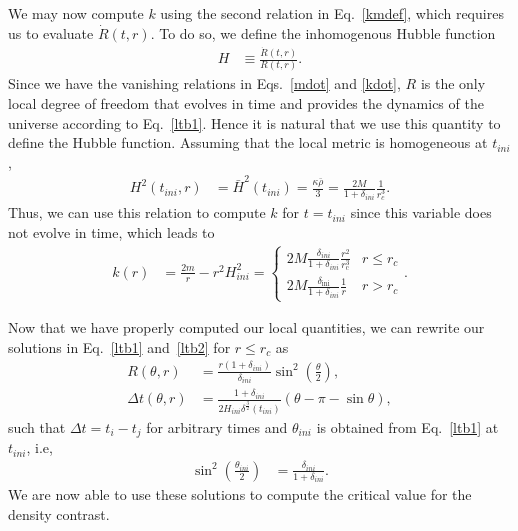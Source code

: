 \documentclass[a4paper,11pt]{article}
\begin{document}
We may now compute $k$ using the second relation in Eq.~\eqref{kmdef}, which requires us to evaluate $\dot{R}(t, r)$. To do so, we define the inhomogenous Hubble function
\begin{align}
	\label{hdefltb}
	H & \equiv \frac{\dot{R}(t, r)}{R(t, r)}
	.\end{align}
Since we have the vanishing relations in Eqs.~\eqref{mdot} and \eqref{kdot}, $R$ is the
only local degree of freedom that evolves in time and provides the dynamics of the
universe according to Eq.~\eqref{ltb1}. Hence it is natural that we use this quantity to
define the Hubble function.  Assuming that the local metric is homogeneous at $t_{ini}$,
\begin{align}
	\label{hinicond}
	H^2(t_{ini}, r) & = \bar{H}^2(t_{ini}) = \frac{ \kappa \bar{\rho}}{3} = \frac{2 M}{1 +  \delta_{ini}} \frac{1}{r_c^3}
	.\end{align}
Thus, we can use this relation to compute $k$ for $t = t_{ini}$ since this variable does not evolve in time, which leads to
\begin{align}
	k(r) & = \frac{2m}{r} - r^2H^2_{ini}= \left\{\begin{array}{ll}
		                                             2M\frac{\delta_{ini}}{1+\delta_{ini}}\frac{r^2}{r_\mathrm{c}^3} & r \leq r_c \\
		                                             2M\frac{\delta_\mathrm{ini}}{1+\delta_{ini}}\frac{1}{r}         & r > r_c
	                                             \end{array}\right.
	.\end{align}

Now that we have properly computed our local quantities, we can rewrite our solutions in Eq.~\eqref{ltb1} and~\eqref{ltb2} for $r\leq r_c$ as
\begin{align}
	\label{ltb3}
	R(\theta, r)        & = \frac{r (1+\delta_{ini})}{\delta_{ini}}\sin^2\left(\frac{\theta}{2}\right),                             \\
	\label{ltb4}
	\Delta t(\theta,r ) & = \frac{1 + \delta_{ini}}{2H_{ini}\delta^{\frac{3}{2}}(t_{ini})}\left(\theta - \pi - \sin \theta \right),
\end{align}
such that $\Delta t = t_i - t_j$ for arbitrary times and $\theta_{ini}$ is obtained from Eq.~\eqref{ltb1} at $t_{ini}$, i.e,
\begin{align}
	\label{sintheta}
	\sin^2\left(\frac{\theta_{ini}}{2}\right) & = \frac{\delta_{ini}}{1 + \delta_{ini}}
	.\end{align}
We are now able to use these solutions to compute the critical value for the density contrast.
\end{document}
